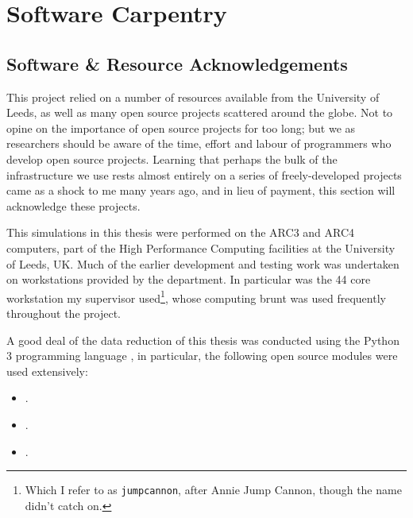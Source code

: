 \chapter{Software Carpentry}

\section{Software \& Resource Acknowledgements}

This project relied on a number of resources available from the University of Leeds, as well as many open source projects scattered around the globe.
Not to opine on the importance of open source projects for too long; but we as researchers should be aware of the time, effort and labour of programmers who develop open source projects.
Learning that perhaps the bulk of the infrastructure we use rests almost entirely on a series of freely-developed projects came as a shock to me many years ago, and in lieu of payment, this section will acknowledge these projects.

This simulations in this thesis were performed on the ARC3 and ARC4 computers, part of the High Performance Computing facilities at the University of Leeds, UK.
Much of the earlier development and testing work was undertaken on workstations provided by the department.
In particular was the 44 core workstation my supervisor used\footnote{Which I refer to as \texttt{jumpcannon}, after Annie Jump Cannon, though the name didn't catch on.}, whose computing brunt was used frequently throughout the project.

A good deal of the data reduction of this thesis was conducted using the Python 3 programming language \parencite{10.5555/1593511}, in particular, the following open source modules were used extensively:

\begin{itemize}
  \item {} \parencite{harris2020array}.
  \item {} \parencite{astropy:2013,astropy:2018}.
  \item {} \parencite{Hunter:2007}.
\end{itemize}

